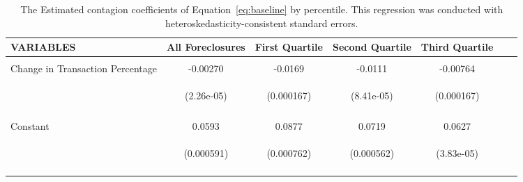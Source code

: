
\begin{table}\Tiny\label{table:nonlin_results}
\begin{centering}
\caption{\Tiny The Estimated contagion coefficients of Equation~\ref{eq:baseline} by percentile. This regression was conducted with heteroskedasticity-consistent standard errors.}

\begin{tabular}{lcccccc} \hline

VARIABLES & All Foreclosures & First Quartile & Second Quartile & Third Quartile \\ \hline
 &    &  &  &  \\
Change in Transaction Percentage                 &-0.00270 & -0.0169 & -0.0111 & -0.00764\\
& \begin{footnotesize}(2.26e-05)\end{footnotesize} & \begin{footnotesize}(0.000167)\end{footnotesize} & \begin{footnotesize}(8.41e-05)\end{footnotesize} & \begin{footnotesize}(0.000167)\end{footnotesize} & 
 \\
\vspace{4pt}& \begin{footnotesize}\end{footnotesize} & \begin{footnotesize}\end{footnotesize} & \begin{footnotesize}\end{footnotesize} & \begin{footnotesize}\end{footnotesize} & \begin{footnotesize}\end{footnotesize}\\
Constant                          & 0.0593 &0.0877 &0.0719 &0.0627\\
& \begin{footnotesize}(0.000591)\end{footnotesize} & 
\begin{footnotesize}(0.000762)\end{footnotesize} & \begin{footnotesize}(0.000562)\end{footnotesize} & \begin{footnotesize}(3.83e-05)\end{footnotesize}  \\

 &  &  &  &  &  \\
 \hline
\end{tabular}
\end{centering}
\end{table}